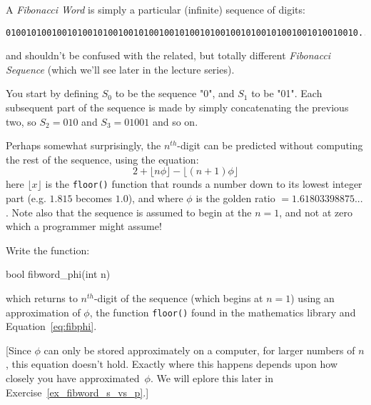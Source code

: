 \label{sec:fibword_phi}



A {\em Fibonacci Word} is simply a particular (infinite) sequence of digits:
\begin{verbatim}
010010100100101001010010010100100101001010010010100101001001010010010...
\end{verbatim}
and shouldn't be confused with the related, but totally different {\em Fibonacci Sequence} (which we'll see later in the lecture series).

You start by defining $S_0$ to be the sequence "0", and $S_1$ to be 
"01". Each subsequent part of the sequence is made by simply concatenating
the previous two, so $S_2 = 010$ and $S_3 = 01001$ and so on.

Perhaps somewhat surprisingly, the $n^{th}$-digit can be
predicted without computing the rest of the sequence, using the equation:
\begin{equation}
\label{eq:fibphi}
2 + \lfloor n \phi \rfloor - \lfloor (n+1) \phi \rfloor
\end{equation}
here $\lfloor x \rfloor$ is the \verb^floor()^ function that
rounds a number down to its lowest integer part (e.g. $1.815$ becomes
$1.0$), and where $\phi$ is the golden ratio $=1.61803398875...$.
Note also that the sequence is assumed to begin at the $n=1$, and not 
at zero which a programmer might assume!

\begin{exercise}
\label{ex:fibword_phi}
Write the function:
\begin{codesnippet}
bool fibword_phi(int n)
\end{codesnippet}
which returns to $n^{th}$-digit of the sequence (which begins at $n=1$)
using an approximation of $\phi$, the function \verb^floor()^ found in 
the mathematics library and Equation~\ref{eq:fibphi}.
\end{exercise}

[Since $\phi$ can only be stored approximately on a computer,
for larger numbers of $n$, this equation doesn't hold. Exactly
where this happens depends upon how closely you have approximated~$\phi$.
We will eplore this later in Exercise~\ref{ex_fibword_s_vs_p}.]
